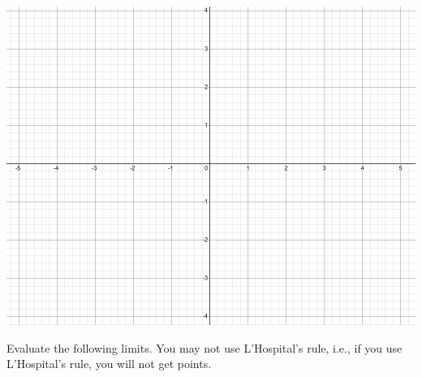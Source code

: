 \documentclass[addpoints, 12pt]{exam}%
\newcommand{\ra}{\rightarrow}
\theoremstyle{definition}
\begin{document}
\begin{questions}
	
	\begin{center}
	\includegraphics[scale=0.35]{desmos-blank}
	\end{center}
	
	\newpage
	
	
	\question
		
	Evaluate the following limits. You may not use L'Hospital's rule, i.e., if you use L'Hospital's rule, you will not get points.\\
	
\end{questions}
\end{document}
